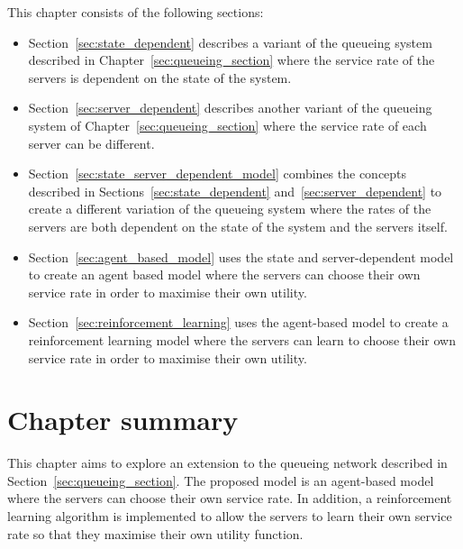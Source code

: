 This chapter consists of the following sections:
\begin{itemize}
    \item Section~\ref{sec:state_dependent} describes a variant of the queueing
    system described in Chapter~\ref{sec:queueing_section} where the service
    rate of the servers is dependent on the state of the system.
    \item Section~\ref{sec:server_dependent} describes another variant of the
    queueing system of Chapter~\ref{sec:queueing_section} where the service
    rate of each server can be different.
    \item Section~\ref{sec:state_server_dependent_model} combines the concepts
    described in Sections~\ref{sec:state_dependent}
    and~\ref{sec:server_dependent} to create a different variation of the
    queueing system where the rates of the servers are both dependent on the
    state of the system and the servers itself.
    \item Section~\ref{sec:agent_based_model} uses the state and
    server-dependent model to create an agent based model where the servers
    can choose their own service rate in order to maximise their own utility.
    \item Section~\ref{sec:reinforcement_learning} uses the agent-based model
    to create a reinforcement learning model where the servers can learn to
    choose their own service rate in order to maximise their own utility.
\end{itemize}













\section{Chapter summary}

This chapter aims to explore an extension to the queueing network described in
Section~\ref{sec:queueing_section}.
The proposed model is an agent-based model where the servers can choose their
own service rate.
In addition, a reinforcement learning algorithm is implemented to allow the
servers to learn their own service rate so that they maximise their own utility
function.

